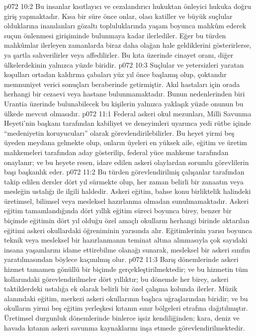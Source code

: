 \vs p072 10:2 Bu insanlar kısıtlayıcı ve cezalandırıcı hukuktan önleyici hukuka doğru giriş yapmaktadır. Kısa bir süre önce onlar, olası katiller ve büyük suçlular olduklarına inanılanları gözaltı topluluklarında yaşam boyunca mahkûm ederek suçun önlenmesi girişiminde bulunmaya kadar ilerlediler. Eğer bu türden mahkûmlar ilerleyen zamanlarda biraz daha olağan hale geldiklerini gösterirlerse, ya şartla salıverilirler veya affedilirler. Bu kıta üzerinde cinayet oranı, diğer ülkelerdekinin yalnızca yüzde biridir.
\vs p072 10:3 Suçlular ve yetersizleri yaratan koşulları ortadan kaldırma çabaları yüz yıl önce başlamış olup, çoktandır memnuniyet verici sonuçları beraberinde getirmiştir. Akıl hastaları için orada herhangi bir cezaevi veya hastane bulunmamaktadır. Bunun nedenlerinden biri Urantia üzerinde bulunabilecek bu kişilerin yalnızca yaklaşık yüzde onunun bu ülkede mevcut olmasıdır.
\vs p072 11:1 Federal askeri okul mezunları, Milli Savunma Heyeti’nin başkanı tarafından kabiliyet ve deneyimleri uyarınca yedi rütbe içinde “medeniyetin koruyucuları” olarak görevlendirilebilirler. Bu heyet yirmi beş üyeden meydana gelmekte olup, onların üyeleri en yüksek aile, eğitim ve üretim mahkemeleri tarafından aday gösterilip, federal yüce mahkeme tarafından onaylanır; ve bu heyete resen, idare edilen askeri olaylardan sorumlu görevlilerin başı başkanlık eder.
\vs p072 11:2 Bu türden görevlendirilmiş çalışanlar tarafından takip edilen dersler dört yıl sürmekte olup, her zaman belirli bir zanaatın veya mesleğin ustalığı ile ilgili haldedir. Askeri eğitim, bahse konu birliktelik halindeki üretimsel, bilimsel veya mesleksel hazırlanma olmadan sunulmamaktadır. Askeri eğitim tamamlandığında dört yıllık eğitim süreci boyunca birey, benzer bir biçimde eğitimin dört yıl olduğu özel amaçlı okulların herhangi birinde aktarılan eğitimi askeri okullardaki öğreniminin yarısında alır. Eğitimlerinin yarısı boyunca teknik veya mesleksel bir hazırlanmanın teminat altına alınmasıyla çok sayıdaki insana yaşamlarını idame ettirebilme olanağı sunarak, mesleksel bir askeri sınıfın yaratılmasından böylece kaçınılmış olur.
\vs p072 11:3 Barış dönemlerinde askeri hizmet tamamen gönüllü bir biçimde gerçekleştirilmektedir; ve bu hizmetin tüm kollarındaki görevlendirilmeler dört yıllıktır; bu dönemde her birey, askeri taktiklerdeki ustalığa ek olarak belirli bir özel çalışma kolunda ilerler. Müzik alanındaki eğitim, merkezi askeri okullarının başlıca uğraşlarından biridir; ve bu okulların yirmi beş eğitim yerleşkesi kıtanın sınır bölgeleri etrafına dağıtılmıştır. Üretimsel durgunluk dönemlerinde binlerce işsiz kendiliğinden; kara, deniz ve havada kıtanın askeri savunma kaynaklarını inşa etmede görevlendirilmektedir.
